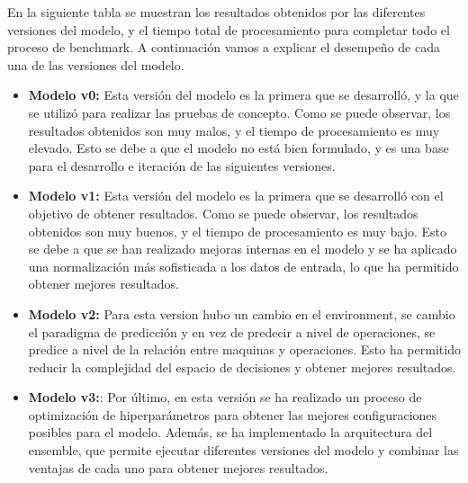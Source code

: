 En la siguiente tabla se muestran los resultados obtenidos por las
diferentes versiones del modelo, y el tiempo total de procesamiento
para completar todo el proceso de benchmark. A continuación vamos a
explicar el desempeño de cada una de las versiones del modelo.
\begin{itemize}
    \item \textbf{Modelo v0:} Esta versión del modelo es la primera que se
        desarrolló, y la que se utilizó para realizar las pruebas de
        concepto. Como se puede observar, los resultados obtenidos son
        muy malos, y el tiempo de procesamiento es muy elevado. Esto
        se debe a que el modelo no está bien formulado, y es una base
        para el desarrollo e iteración de las siguientes versiones.
    \item \textbf{Modelo v1:} Esta versión del modelo es la primera que
        se desarrolló con el objetivo de obtener resultados. Como se
        puede observar, los resultados obtenidos son muy buenos, y el
        tiempo de procesamiento es muy bajo. Esto se debe a que se han
        realizado mejoras internas en el modelo y se ha aplicado una
        normalización más sofisticada a los datos de entrada, lo que
        ha permitido obtener mejores resultados.
    \item \textbf{Modelo v2:} Para esta version hubo un cambio en el
        environment, se cambio el paradigma de predicción y en vez
        de predecir a nivel de operaciones, se predice a nivel de
        la relación entre maquinas y operaciones. Esto ha permitido
        reducir la complejidad del espacio de decisiones y obtener
        mejores resultados.
    \item \textbf{Modelo v3:}: Por último, en esta versión se ha
        realizado un proceso de optimización de hiperparámetros para obtener
        las mejores configuraciones posibles para el modelo. Además,
        se ha implementado la arquitectura del ensemble, que permite
        ejecutar diferentes versiones del modelo y combinar las
        ventajas de cada uno para obtener mejores resultados.
\end{itemize}

